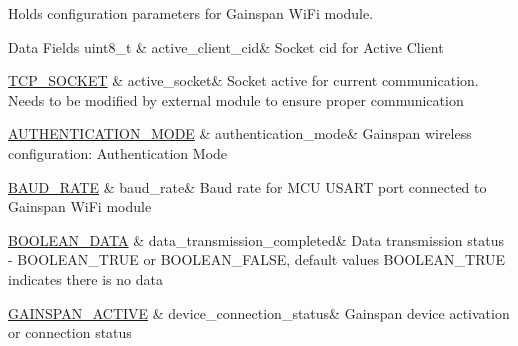 Holds configuration parameters for Gainspan Wi\+Fi module. \begin{DoxyFields}{Data Fields}
uint8\+\_\+t\hypertarget{group__wireless__interface_ae09b115cb8cf8befaf6c072ec8034d67}{}\label{group__wireless__interface_ae09b115cb8cf8befaf6c072ec8034d67}
&
active\+\_\+client\+\_\+cid&
Socket cid for Active Client \\
\hline

\hyperlink{group__wireless__interface_gab2d7ad3f99c2b04b0f5f5a77eefc5355}{T\+C\+P\+\_\+\+S\+O\+C\+K\+ET}\hypertarget{group__wireless__interface_ad796ac7731745caf1e15eb197c98c2fb}{}\label{group__wireless__interface_ad796ac7731745caf1e15eb197c98c2fb}
&
active\+\_\+socket&
Socket active for current communication. Needs to be modified by external module to ensure proper communication \\
\hline

\hyperlink{group__wireless__interface_gab857a286e4eb7fe1039f12ab48d4a3be}{A\+U\+T\+H\+E\+N\+T\+I\+C\+A\+T\+I\+O\+N\+\_\+\+M\+O\+DE}\hypertarget{group__wireless__interface_a78234c3e0314f4e08915d60ec5f5be4a}{}\label{group__wireless__interface_a78234c3e0314f4e08915d60ec5f5be4a}
&
authentication\+\_\+mode&
Gainspan wireless configuration\+: Authentication Mode \\
\hline

\hyperlink{group__wireless__interface_gafd83f18bb43add6a2eaf3228fec2fed7}{B\+A\+U\+D\+\_\+\+R\+A\+TE}\hypertarget{group__wireless__interface_a85a97cf094c061b7e7a8ef7007efd3f3}{}\label{group__wireless__interface_a85a97cf094c061b7e7a8ef7007efd3f3}
&
baud\+\_\+rate&
Baud rate for M\+CU U\+S\+A\+RT port connected to Gainspan Wi\+Fi module \\
\hline

\hyperlink{group__wireless__interface_ga8bb14f539316556e9d58cd68b262f7b0}{B\+O\+O\+L\+E\+A\+N\+\_\+\+D\+A\+TA}\hypertarget{group__wireless__interface_a9f7cd0752c6c8562e1689a61a2386375}{}\label{group__wireless__interface_a9f7cd0752c6c8562e1689a61a2386375}
&
data\+\_\+transmission\+\_\+completed&
Data transmission status -\/ B\+O\+O\+L\+E\+A\+N\+\_\+\+T\+R\+UE or B\+O\+O\+L\+E\+A\+N\+\_\+\+F\+A\+L\+SE, default values B\+O\+O\+L\+E\+A\+N\+\_\+\+T\+R\+UE indicates there is no data \\
\hline

\hyperlink{group__wireless__interface_ga2d6a1c69aec7812a8dc23ed99f96558e}{G\+A\+I\+N\+S\+P\+A\+N\+\_\+\+A\+C\+T\+I\+VE}\hypertarget{group__wireless__interface_a831fa347724461c643da5ef2c2147a9d}{}\label{group__wireless__interface_a831fa347724461c643da5ef2c2147a9d}
&
device\+\_\+connection\+\_\+status&
Gainspan device activation or connection status \\
\hline


\end{DoxyFields}
